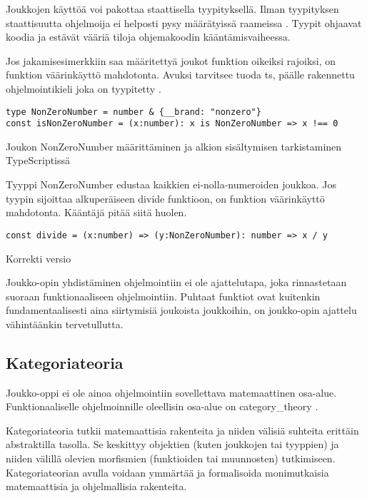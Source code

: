 Joukkojen käyttöä voi pakottaa staattisella tyypityksellä. Ilman tyypityksen staattisuutta ohjelmoija ei helposti pysy määrätyissä raameissa \cite[44]{cantarella_fp_haitat}. Tyypit ohjaavat koodia ja estävät vääriä tiloja ohjemakoodin kääntämisvaiheessa.

Jos jakamisesimerkkiin saa määritettyä joukot funktion oikeiksi rajoiksi, on funktion väärinkäyttö mahdotonta. Avuksi tarvitsee tuoda \gls{ts},  päälle rakennettu ohjelmointikieli joka on tyypitetty \cite{typsecript_website}.

\begin{code}
	\begin{verbatim}
type NonZeroNumber = number & {__brand: "nonzero"}
const isNonZeroNumber = (x:number): x is NonZeroNumber => x !== 0
\end{verbatim}
	\label{code:ts_set_theory_5}
	\caption{Joukon NonZeroNumber määrittäminen ja alkion sisältymisen tarkistaminen TypeScriptissä}
\end{code}

Tyyppi NonZeroNumber edustaa kaikkien ei-nolla-numeroiden joukkoa. Jos tyypin sijoittaa alkuperäiseen divide funktioon, on funktion väärinkäyttö mahdotonta. Kääntäjä pitää siitä huolen.


\begin{code}
	\begin{verbatim}
const divide = (x:number) => (y:NonZeroNumber): number => x / y
\end{verbatim}
	\caption{Korrekti versio}
	\label{code:ts_set_theory_6}
\end{code}

Joukko-opin yhdistäminen ohjelmointiin ei ole ajattelutapa, joka rinnastetaan suoraan funktionaaliseen ohjelmointiin. Puhtaat funktiot ovat kuitenkin fundamentaalisesti aina siirtymisiä joukoista joukkoihin, on joukko-opin ajattelu vähintäänkin tervetullutta.



\subsection{Kategoriateoria}


Joukko-oppi ei ole ainoa ohjelmointiin sovellettava matemaattinen osa-alue. Funktionaaliselle ohjelmoinnille oleellisin osa-alue on \gls{category_theory} \cite{bartosz_category_for_progamers,promises-spec-94}.

Kategoriateoria tutkii matemaattisia rakenteita ja niiden välisiä suhteita erittäin abstraktilla tasolla. Se keskittyy objektien (kuten joukkojen tai tyyppien) ja niiden välillä olevien morfismien (funktioiden tai muunnosten) tutkimiseen. Kategoriateorian avulla voidaan ymmärtää ja formalisoida monimutkaisia matemaattisia ja ohjelmallisia rakenteita. \citep{bartosz_category_for_progamers,promises-spec-94,category_theory}

